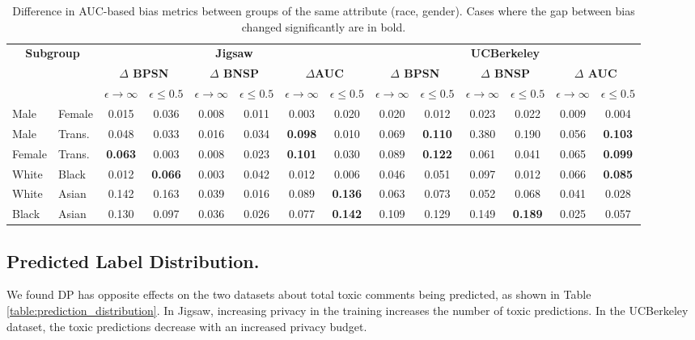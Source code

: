 \documentclass[11pt]{article} %
\begin{document}
\begin{table}[htbp]
\centering
\begin{adjustbox}{max width=0.98\textwidth}
\begin{tabular}{@{}ll|cccccc|cccccc@{}}
\toprule
\multicolumn{2}{c}{\textbf{Subgroup}} & \multicolumn{6}{c}{\textbf{Jigsaw}} & \multicolumn{6}{c}{\textbf{UCBerkeley}} \\
& & \multicolumn{2}{c}{\textbf{$\Delta$ BPSN}} & \multicolumn{2}{c}{\textbf{$\Delta$ BNSP}}& \multicolumn{2}{c}{\textbf{$\Delta$AUC}}  & \multicolumn{2}{c}{\textbf{$\Delta$ BPSN}} & \multicolumn{2}{c}{\textbf{$\Delta$ BNSP}} & \multicolumn{2}{c}{\textbf{$\Delta$ AUC}} \\ 
& & $\epsilon \to \infty$ & $\epsilon \le 0.5$ & $\epsilon \to \infty$ & $\epsilon \le 0.5$ & $\epsilon \to \infty$ & $\epsilon \le 0.5$ & $\epsilon \to \infty$ &  $\epsilon \le 0.5$ & $\epsilon \to \infty$ & $\epsilon \le 0.5$ & $\epsilon \to \infty$ & $\epsilon \le 0.5$\\ \midrule
Male & Female & 0.015 & 0.036 & 0.008 & 0.011 & 0.003 & 0.020 & 0.020 & 0.012 & 0.023 & 0.022 & 0.009 & 0.004 \\ 
Male & Trans. & 0.048 & 0.033 & 0.016 & 0.034 & \textbf{0.098} & 0.010 & 0.069 & \textbf{0.110} & 0.380 & 0.190 & 0.056 & \textbf{0.103} \\ 
Female & Trans. & \textbf{0.063 } & 0.003 & 0.008 & 0.023 & \textbf{0.101} & 0.030 & 0.089 & \textbf{0.122} & 0.061 & 0.041 & 0.065 & \textbf{0.099} \\ \midrule

White & Black & 0.012 & \textbf{0.066} & 0.003 & 0.042 & 0.012 & 0.006 & 0.046 & 0.051 & 0.097 & 0.012 & 0.066 & \textbf{0.085} \\ 
White & Asian & 0.142 & 0.163 &  0.039 & 0.016 & 0.089 & \textbf{0.136} & 0.063 & 0.073 & 0.052 & 0.068 & 0.041 & 0.028 \\ 
Black & Asian & 0.130 & 0.097 & 0.036 & 0.026  & 0.077 & \textbf{0.142} & 0.109 & 0.129 & 0.149 & \textbf{0.189} & 0.025 & 0.057 \\ 
 \bottomrule
\end{tabular}
\end{adjustbox}
\caption{Difference in AUC-based bias metrics between groups of the same attribute (race, gender). Cases where the gap between bias changed significantly are in bold. }
\label{table:gap}
\end{table}


\subsection{Predicted Label Distribution. \label{sec:label_distribution}}
We found DP has opposite effects on the two datasets about total toxic comments being predicted, as shown in Table \ref{table:prediction_distribution}. In Jigsaw, increasing privacy in the training increases the number of toxic predictions. In the UCBerkeley dataset, the toxic predictions decrease with an increased privacy budget.
\end{document}
